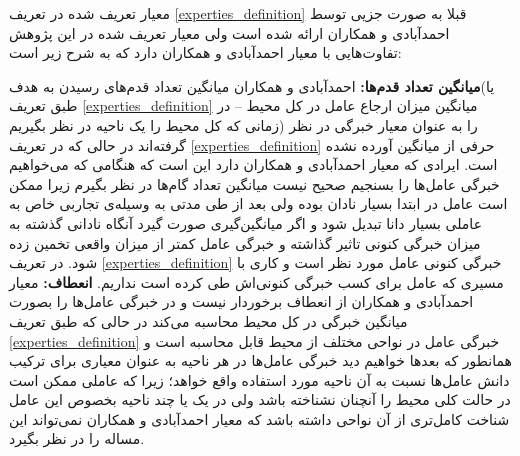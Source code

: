 معیار تعریف شده در تعریف
\ref{experties_definition}
قبلا به صورت جزیی توسط احمدآبادی و همکاران ارائه شده است ولی معیار تعریف شده در این پژوهش تفاوت‌هایی با معیار احمدآبادی و همکاران دارد که به شرح زیر است:
\begin{enumerate}
 \textbf{میانگین تعداد قدم‌ها:} احمدآبادی و همکاران میانگین تعداد قدم‌های رسیدن به هدف(یا طبق تعریف
\ref{experties_definition}
میانگین میزان ارجاع عامل در کل محیط -- در زمانی که کل محیط را یک ناحیه در نظر بگیریم) را به عنوان معیار خبرگی در نظر گرفته‌اند در حالی که در تعریف
\ref{experties_definition}
حرفی از میانگین آورده نشده است.  ایرادی که معیار احمدآبادی و همکاران دارد این است که هنگامی که می‌خواهیم خبرگی عامل‌ها را بسنجیم صحیح نیست میانگین تعداد گام‌ها در نظر بگیرم زیرا ممکن است عامل در ابتدا بسیار نادان بوده ولی بعد از طی مدتی به وسیله‌ی تجاربی خاص به عاملی بسیار دانا تبدیل شود و اگر میانگین‌گیری صورت گیرد آنگاه نادانی گذشته به میزان خبرگی کنونی تاثیر گذاشته و خبرگی عامل کمتر از میزان واقعی تخمین زده شود. در تعریف
\ref{experties_definition}
خبرگی کنونی عامل مورد نظر است و کاری با مسیری که عامل برای کسب خبرگی کنونی‌اش طی کرده است نداریم.
 \textbf{انعطاف:} معیار احمدآبادی و همکاران از انعطاف برخوردار نیست و در خبرگی عامل‌ها را بصورت میانگین خبرگی در کل محیط محاسبه می‌کند در حالی که طبق تعریف
\ref{experties_definition}
خبرگی عامل در نواحی مختلف از محیط قابل محاسبه است و همانطور که بعدها خواهیم دید خبرگی عامل‌ها در هر ناحیه به عنوان معیاری برای ترکیب دانش عامل‌ها نسبت به آن ناحیه مورد استفاده واقع خواهد؛ زیرا که عاملی ممکن است در حالت کلی محیط را آنچنان نشناخته باشد ولی در یک یا چند ناحیه بخصوص این عامل شناخت کامل‌تری از آن نواحی داشته باشد که معیار احمدآبادی و همکاران نمی‌تواند این مساله را در نظر بگیرد.
\end{enumerate}



